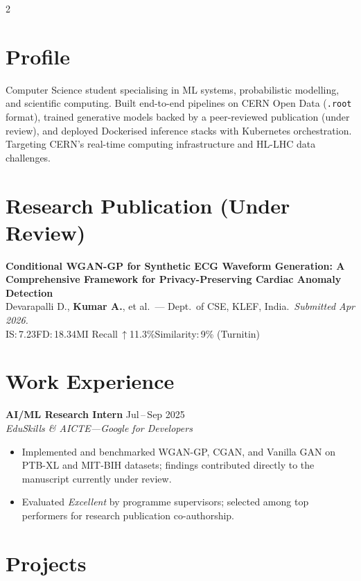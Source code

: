 \documentclass[10pt,a4paper]{extarticle}
\begin{document}
\begin{paracol}{2}
\begin{rightcolumn}

\section*{Profile}
{\small
Computer Science student specialising in ML systems, probabilistic modelling, and scientific computing. Built end-to-end pipelines on CERN Open Data (\texttt{.root} format), trained generative models backed by a peer-reviewed publication (under review), and deployed Dockerised inference stacks with Kubernetes orchestration. Targeting CERN's real-time computing infrastructure and HL-LHC data challenges.}

\section*{Research Publication {\normalfont\small\color{subtlegray}(Under Review)}}
{\small
\textbf{Conditional WGAN-GP for Synthetic ECG Waveform Generation: A Comprehensive Framework for Privacy-Preserving Cardiac Anomaly Detection}\\[1pt]
Devarapalli D., \textbf{Kumar A.}, et al.\ --- Dept.\ of CSE, KLEF, India.\ \textit{Submitted Apr 2026.}\\[1pt]
{\color{subtlegray}IS:\,7.23\quad FD:\,18.34\quad MI Recall\,$\uparrow$11.3\%\quad Similarity:\,9\% (Turnitin)}
}

\section*{Work Experience}
{\small
\textbf{AI/ML Research Intern} \hfill Jul\,--\,Sep 2025\\
\textit{EduSkills \& AICTE\;---\;Google for Developers}
\begin{itemize}
  \item Implemented and benchmarked WGAN-GP, CGAN, and Vanilla GAN on PTB-XL and MIT-BIH datasets; findings contributed directly to the manuscript currently under review.
  \item Evaluated \textit{Excellent} by programme supervisors; selected among top performers for research publication co-authorship.
\end{itemize}
}

\section*{Projects}


\end{rightcolumn}
\end{paracol}
\end{document}
